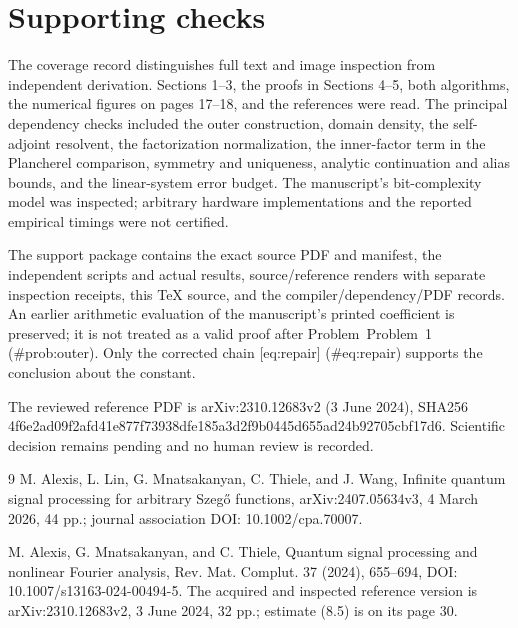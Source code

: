 \documentclass[10pt]{article}
\begin{document}
\section*{Supporting checks}
The coverage record distinguishes full text and image inspection from independent derivation. Sections 1–3, the proofs in Sections 4–5, both algorithms, the numerical figures on pages 17–18, and the references were read. The principal dependency checks included the outer construction, domain density, the self-adjoint resolvent, the factorization normalization, the inner-factor term in the Plancherel comparison, symmetry and uniqueness, analytic continuation and alias bounds, and the linear-system error budget. The manuscript’s bit-complexity model was inspected; arbitrary hardware implementations and the reported empirical timings were not certified.\par
The support package contains the exact source PDF and manifest, the independent scripts and actual results, source/reference renders with separate inspection receipts, this TeX source, and the compiler/dependency/PDF records. An earlier arithmetic evaluation of the manuscript’s printed coefficient is preserved; it is not treated as a valid proof after Problem Problem 1 (\#prob:outer). Only the corrected chain [eq:repair] (\#eq:repair) supports the conclusion about the constant.\par
The reviewed reference PDF is arXiv:2310.12683v2 (3 June 2024), SHA256 4f6e2ad09f2afd41e877f73938dfe185a3d2f9b0445d655ad24b92705cbf17d6. Scientific decision remains pending and no human review is recorded.\par
9 M. Alexis, L. Lin, G. Mnatsakanyan, C. Thiele, and J. Wang, Infinite quantum signal processing for arbitrary Szegő functions, arXiv:2407.05634v3, 4 March 2026, 44 pp.; journal association DOI: 10.1002/cpa.70007.\par
M. Alexis, G. Mnatsakanyan, and C. Thiele, Quantum signal processing and nonlinear Fourier analysis, Rev. Mat. Complut. 37 (2024), 655–694, DOI: 10.1007/s13163-024-00494-5. The acquired and inspected reference version is arXiv:2310.12683v2, 3 June 2024, 32 pp.; estimate (8.5) is on its page 30.\par
\end{document}
